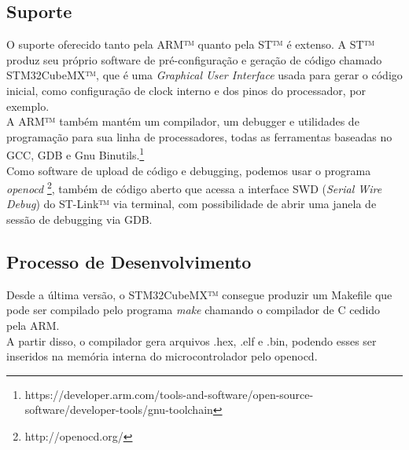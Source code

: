 \documentclass[10pt,a4paper]{report}
\begin{document}
	\subsection{Suporte}
	O suporte oferecido tanto pela ARM™ quanto pela ST™ é extenso. A ST™ produz seu próprio software de pré-configuração e geração de código chamado STM32CubeMX™, que é uma {\it Graphical User Interface} usada para gerar o código inicial, como configuração de clock interno e dos pinos do processador, por exemplo.\\
	
	A ARM™ também mantém um compilador, um debugger e utilidades de programação para sua linha de processadores, todas as ferramentas baseadas no GCC, GDB e Gnu Binutils.\footnote{https://developer.arm.com/tools-and-software/open-source-software/developer-tools/gnu-toolchain}\\
	
	Como software de upload de código e debugging, podemos usar o programa {\it openocd} \footnote{http://openocd.org/}, também de código aberto que acessa a interface SWD ({\it Serial Wire Debug}) do ST-Link™ via terminal, com possibilidade de abrir uma janela de sessão de debugging via GDB.
	
	\subsection{Processo de Desenvolvimento}
	Desde a última versão, o STM32CubeMX™ consegue produzir um Makefile que pode ser compilado pelo programa {\it make} chamando o compilador de C cedido pela ARM.\\
	
	A partir disso, o compilador gera arquivos .hex, .elf e .bin, podendo esses ser inseridos na memória interna do microcontrolador pelo openocd.\\
	
\end{document}
